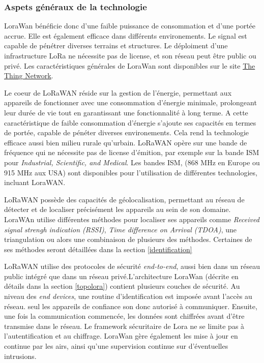 \subsubsection{Aspets généraux de la technologie}

LoraWan bénéficie donc d'une faible puissance de consommation et d'une portée accrue. Elle est également efficace dans différents environements. Le signal est capable de pénétrer diverses terrains et structures.
Le déploiment d'une infrastructure LoRa ne nécessite pas de license, et son réseau peut être public ou privé. Les caractéristiques générales de LoraWan sont disponibles sur le site \href{https://www.thethingsnetwork.org/docs/lorawan/}{The Thing Network}.

\vspace{0.1cm}

Le coeur de LoRaWAN réside sur la gestion de l'énergie, permettant aux appareils de fonctionner avec une consommation d'énergie minimale, prolongeant leur durée de vie tout en garantissant une fonctionnalité à long terme. A cette caractéristique de faible consommation d'énergie s'ajoute ses capacités en termes de portée, capable de pénéter diverses environements. Cela rend la technologie efficace aussi bien milieu rurale qu'urbain. LoRaWAN opère sur une bande de fréquence qui ne nécessite pas de license d'émition, par exemple sur la bande ISM pour \textit{Industrial, Scientific, and Medical}. Les bandes ISM, (868 MHz en Europe ou 915 MHz aux USA) sont disponibles pour l'utilisation de différentes technologies, incluant LoraWAN.

\vspace{0.1cm}

LoRaWAN possède des capacités de géolocalisation, permettant au réseau de détecter et de localiser précisément les appareils au sein de son domaine. LoraWAn utilise différentes méthodes pour localiser ses appareils comme \textit{Received signal strengh indication (RSSI)}, \textit{Time difference on Arrival (TDOA)}, une triangulation ou alors une combinaison de plusieurs des méthodes. Certaines de ses méthodes seront détaillées dans la section \ref{identification}

\vspace{0.1cm}

LoRaWAN utilise des protocoles de sécurité \textit{end-to-end}, aussi bien dans un réseau public intégré que dans un réseau privé.L'architecture LoraWan (décrite en détails dans la section \ref{topolora}) contient plusieurs couches de sécurité. Au niveau des \textit{end devices}, une routine d'identification est imposée avant l'accès au réseau. seul les appareils de confiance son donc autorisé à communiquer. Ensuite, une fois la communication commencée, les données sont chiffrées avant d'être transmise dans le réseau. Le framework sécuritaire de Lora ne se limite pas à l'autentification et au chiffrage. LoraWan gère également les mise à jour en continue par les airs, ainsi qu'une supervision continue sur d'éventuelles intrusions.

